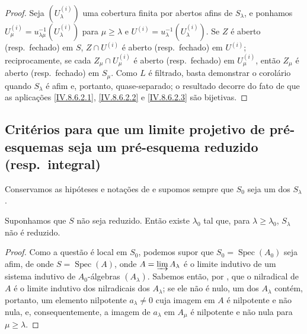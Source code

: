 \begin{proof}
Seja $(U_\lambda^{(i)})$ uma cobertura finita por abertos afins de $S_\lambda$, e ponhamos $U^{(i)}_\mu=u_{\lambda\mu}^{-1}(U_\lambda^{(i)})$ para $\mu\geqslant\lambda$ e $U^{(i)}=u_\lambda^{-1}(U_\lambda^{(i)})$.
Se $Z$ é aberto (resp.\ fechado) em $S$, $Z\cap U^{(i)}$ é aberto (resp.\ fechado) em $U^{(i)}$; reciprocamente, se cada $Z_\mu\cap U^{(i)}_\mu$ é aberto (resp.\ fechado) em $U^{(i)}_\mu$, então $Z_\mu$ é aberto (resp.\ fechado) em $S_\mu$.
Como $L$ é filtrado, basta demonstrar o corolário quando $S_\lambda$ é afim e, portanto, quase-separado; o resultado decorre do fato de que as aplicações \eqref{IV.8.6.2.1}, \eqref{IV.8.6.2.2} e \eqref{IV.8.6.2.3} são bijetivas.
\end{proof}

\subsection{Critérios para que um limite projetivo de pré-esquemas seja um pré-esquema reduzido (resp.\ integral)}
\label{subsection:IV.8.7}

Conservamos as hipóteses e notações de  e supomos sempre que $S_0$ seja um dos $S_\lambda$.

\begin{proposition}[8.7.1]
\label{IV.8.7.1}
Suponhamos que $S$ não seja reduzido.
Então existe $\lambda_0$ tal que, para $\lambda\geqslant\lambda_0$, $S_\lambda$ não é reduzido.
\end{proposition}

\begin{proof}
Como a questão é local em $S_0$, podemos supor que $S_0=\operatorname{Spec}(A_0)$ seja afim, de onde $S=\operatorname{Spec}(A)$, onde $A=\varinjlim A_\lambda$ é o limite indutivo de um sistema indutivo de $A_0$-álgebras $(A_\lambda)$.
Sabemos então, por , que o nilradical de $A$ é o limite indutivo dos nilradicais dos $A_\lambda$; se ele não é nulo, um dos $A_\lambda$ contém, portanto, um elemento nilpotente $a_\lambda\neq 0$ cuja imagem em $A$ é nilpotente e não nula, e, consequentemente, a imagem de $a_\lambda$ em $A_\mu$ é nilpotente e não nula para $\mu\geqslant\lambda$.
\end{proof}


